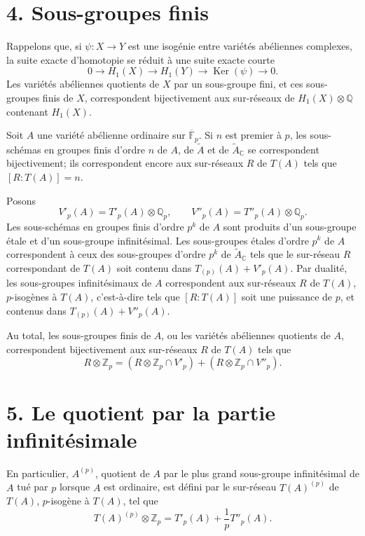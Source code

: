 \documentclass[12pt]{article}
\DeclareMathOperator{\Ker}{Ker}
\newcommand{\Z}{\mathbb{Z}}
\newcommand{\Q}{\mathbb{Q}}
\newcommand{\C}{\mathbb{C}}
\newcommand{\F}{\mathbb{F}}
\theoremstyle{plain}
\theoremstyle{definition}
\theoremstyle{remark}
\begin{document}
\section*{4. Sous-groupes finis}
Rappelons que, si $\psi:X\to Y$ est une isogénie entre variétés abéliennes complexes, la suite exacte d'homotopie se réduit à une suite exacte courte
\[
 0\longrightarrow H_1(X)\longrightarrow H_1(Y)\longrightarrow \Ker(\psi)\longrightarrow0.
\]
Les variétés abéliennes quotients de $X$ par un sous-groupe fini, et ces sous-groupes finis de $X$, correspondent bijectivement aux sur-réseaux de $H_1(X)\otimes\Q$ contenant $H_1(X)$.

Soit $A$ une variété abélienne ordinaire sur $\overline{\F}_p$. Si $n$ est premier à $p$, les sous-schémas en groupes finis d'ordre $n$ de $A$, de $\widetilde A$ et de $\widetilde A_\C$ se correspondent bijectivement; ils correspondent encore aux sur-réseaux $R$ de $T(A)$ tels que $[R:T(A)]=n$.

Posons
\[
 V'_p(A)=T'_p(A)\otimes\Q_p,
\qquad
 V''_p(A)=T''_p(A)\otimes\Q_p.
\]
Les sous-schémas en groupes finis d'ordre $p^k$ de $A$ sont produits d'un sous-groupe étale et d'un sous-groupe infinitésimal. Les sous-groupes étales d'ordre $p^k$ de $A$ correspondent à ceux des sous-groupes d'ordre $p^k$ de $\widetilde A_\C$ tels que le sur-réseau $R$ correspondant de $T(A)$ soit contenu dans $T_{(p)}(A)+V'_p(A)$. Par dualité, les sous-groupes infinitésimaux de $A$ correspondent aux sur-réseaux $R$ de $T(A)$, $p$-isogènes à $T(A)$, c'est-à-dire tels que $[R:T(A)]$ soit une puissance de $p$, et contenus dans $T_{(p)}(A)+V''_p(A)$.

Au total, les sous-groupes finis de $A$, ou les variétés abéliennes quotients de $A$, correspondent bijectivement aux sur-réseaux $R$ de $T(A)$ tels que
\begin{equation}\label{eq:p004-fr-41}
 R\otimes\Z_p=(R\otimes\Z_p\cap V'_p)+(R\otimes\Z_p\cap V''_p).
\end{equation}

\section*{5. Le quotient par la partie infinitésimale}
En particulier, $A^{(p)}$, quotient de $A$ par le plus grand sous-groupe infinitésimal de $A$ tué par $p$ lorsque $A$ est ordinaire, est défini par le sur-réseau $T(A)^{(p)}$ de $T(A)$, $p$-isogène à $T(A)$, tel que
\[
 T(A)^{(p)}\otimes\Z_p=T'_p(A)+\frac{1}{p}T''_p(A).
\]
\end{document}
